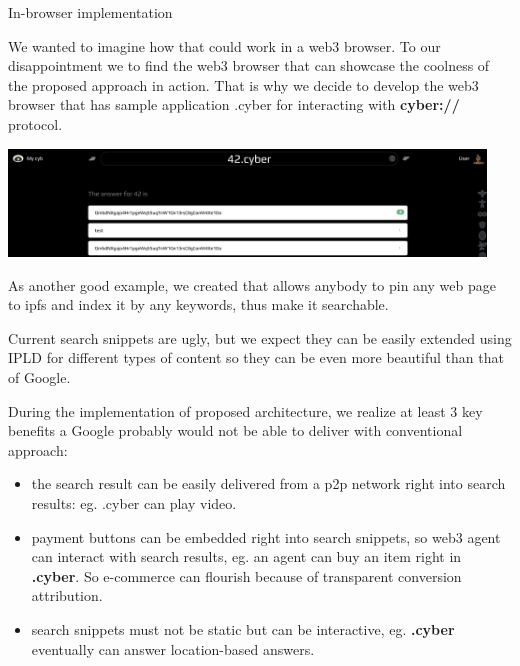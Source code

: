 \documentclass[10pt,oneside]{amsart}
\makeatletter
\def\section{\@startsection{section}{1}%
  \z@{.7\linespacing\@plus\linespacing}{.5\linespacing}%
  {\normalfont\scshape}}%
\newcommand{\code}[1]{\textbf{#1}}
\newenvironment{Figure}
  {\par\medskip\noindent\minipage{\linewidth}}
  {\endminipage\par\medskip}
\newcommand{\linkred}[2]{\href{#1}{\color{red}{#2}}}
\makeatother
\begin{document}
\section{In-browser implementation}\label{In-browser implementation}

We wanted to imagine how that could work in a web3 browser. To our disappointment we 
\linkred{https://github.com/cybercongress/cyb/blob/master/docs/comparison.md}{were not able} to find the web3 browser that can showcase the coolness of the proposed approach in action. That is why we decide to develop the web3 browser 
\linkred{https://github.com/cybercongress/cyb/blob/master/docs/cyb.md}{cyb} that has sample application .cyber for interacting with \code{cyber://} protocol.

\begin{Figure}
  \medskip
  \centering
  \includegraphics[width=0.95\textwidth]{60329155-151be200-9990-11e9-8d78-e32e72285abc.png}
  \medskip
  \end{Figure}

As another good example, we created 
\linkred{https://github.com/cybercongress/cyb-virus}{a Chrome extension} that allows anybody to pin any web page to ipfs and index it by any keywords, thus make it searchable.

Current search snippets are ugly, but we expect they can be easily extended using IPLD for different types of content so they can be even more beautiful than that of Google.

During the implementation of proposed architecture, we realize at least 3 key benefits a Google probably would not be able to deliver with conventional approach:

\begin{itemize}
\item the search result can be easily delivered from a p2p network right into search results: eg. .cyber can play video.
\item payment buttons can be embedded right into search snippets, so web3 agent can interact with search results, eg. an agent can buy an item right in \code{.cyber}. So e-commerce can flourish because of transparent conversion attribution.
\item search snippets must not be static but can be interactive, eg. \code{.cyber} eventually can answer location-based answers.
\end{itemize}
\end{document}
